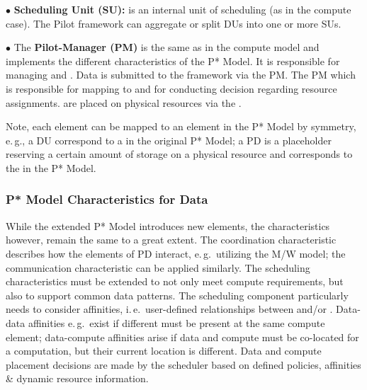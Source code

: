 \documentclass[conference]{IEEEtran}
\begin{document}
\noindent$\bullet$
  \textbf{Scheduling Unit (SU):} is an internal unit of scheduling (as in 
  the compute case). The Pilot framework can aggregate or split DUs into one 
  or more SUs.

\noindent$\bullet$ 
  The \textbf{Pilot-Manager (PM)} is the same as in the compute model and
  implements the different characteristics of the P* Model. It is responsible for
  managing \dus and \sus. Data is submitted to the framework via the PM. The PM
  which is responsible for mapping \dus to \sus and for conducting decision 
  regarding resource assignments. \sus are placed on physical resources via the \pilot.

Note, each element can be mapped to an element in the P* Model by
symmetry, e.\,g., a DU correspond to a \cu  in the original P* Model; 
a PD is a placeholder reserving a certain amount of storage on a physical 
resource and corresponds to the \pilot in the P* Model.



\subsubsection*{P* Model Characteristics for Data}

While the extended P* Model introduces new elements, the
characteristics however, remain the same to a great extent. The
coordination characteristic describes how the elements of PD interact,
e.\,g.\ utilizing the M/W model; the communication characteristic can
be applied similarly. The scheduling characteristics must be extended
to not only meet compute requirements, but also to support common data
patterns. The scheduling component particularly needs to consider
affinities, i.\,e.\ user-defined relationships between \cus and/or
\dus. Data-data affinities e.\,g.\ exist if different \dus must be
present at the same compute element; data-compute affinities arise if
data and compute must be co-located for a computation, but their
current location is different. Data and compute placement decisions
are made by the scheduler based on defined policies, affinities \&
dynamic resource information.
\end{document}
